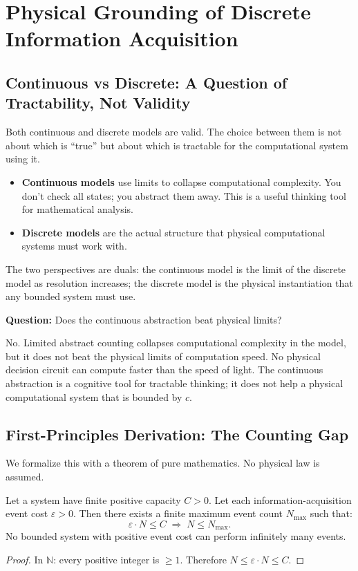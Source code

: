 \section{Physical Grounding of Discrete Information Acquisition}\label{sec:physical-grounding}

\subsection{Continuous vs Discrete: A Question of Tractability, Not Validity}\label{sec:continuous-discrete}

Both continuous and discrete models are valid. The choice between them is not about which is ``true'' but about which is tractable for the computational system using it.

\begin{itemize}
\item \textbf{Continuous models} use limits to collapse computational complexity. You don't check all states; you abstract them away. This is a useful thinking tool for mathematical analysis.

\item \textbf{Discrete models} are the actual structure that physical computational systems must work with.
\end{itemize}

\noindent The two perspectives are duals: the continuous model is the limit of the discrete model as resolution increases; the discrete model is the physical instantiation that any bounded system must use.

\noindent\textbf{Question:} Does the continuous abstraction beat physical limits?

No. Limited abstract counting collapses computational complexity in the model, but it does not beat the physical limits of computation speed. No physical decision circuit can compute faster than the speed of light. The continuous abstraction is a cognitive tool for tractable thinking; it does not help a physical computational system that is bounded by $c$.

\subsection{First-Principles Derivation: The Counting Gap}\label{sec:first-principles}

We formalize this with a theorem of pure mathematics. No physical law is assumed.

\begin{theorem}\label{thm:counting-gap}
Let a system have finite positive capacity $C > 0$. Let each information-acquisition event cost $\varepsilon > 0$. Then there exists a finite maximum event count $N_{\max}$ such that:
\[
  \varepsilon \cdot N \leq C \;\Rightarrow\; N \leq N_{\max}.
\]
No bounded system with positive event cost can perform infinitely many events.

\begin{proof}
In $\mathbb{N}$: every positive integer is $\geq 1$. Therefore $N \leq \varepsilon \cdot N \leq C$.
\end{proof}
\end{theorem}


